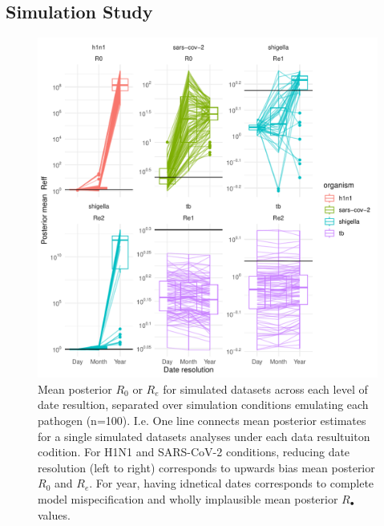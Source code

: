 \documentclass{article}
\begin{document}
\begin{spacing}{1.5}
\subsection*{Simulation Study}

\begin{figure}[h]
\centering
\includegraphics[width = 1\linewidth]{sim_Re_trajectory}
\caption{Mean posterior $R_0$ or $R_e$ for simulated datasets across each level of date resultion, separated over simulation conditions emulating each pathogen (n=100). I.e. One line connects mean posterior estimates for a single simulated datasets analyses under each data resultuiton codition. For H1N1 and SARS-CoV-2 conditions, reducing date resolution (left to right) corresponds to upwards bias mean posterior $R_0$ and $R_e$. For year, having idnetical dates corresponds to complete model mispecification and wholly implausible mean posterior $R_{\bullet}$ values. }
\label{simRe}
\end{figure}



\end{spacing}
\end{document}
